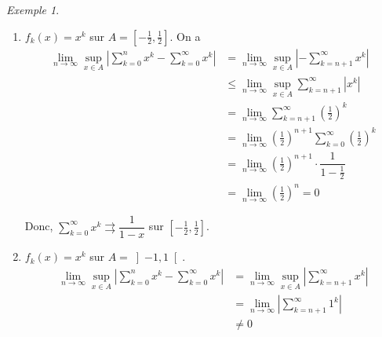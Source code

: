 \documentclass{report}
\newcommand*{\dsum}[4]{\displaystyle\sum_{#1=#2}^{#3}#4}
\newcommand*{\dlim}[3]{\displaystyle\lim_{#1 \to #2}#3}
\newcommand*{\abs}[1]{\left| #1 \right|}
\newcommand*{\convuni}{\rightrightarrows}
\newcommand*{\lte}{\leqslant}
\theoremstyle{definition}
\theoremstyle{remark}
\newtheorem*{exem}{Exemple}
\begin{document}
	\begin{exem}~

		\begin{enumerate}[label=\alph*)]
			\item $f_k(x)=x^k$ sur $A=\left[ -\frac{1}{2}, \frac{1}{2} \right]$. On a
			\begin{align*}
				\dlim{n}{\infty}{\sup\limits_{x \in A}\abs{\dsum{k}{0}{n}{x^k} - \dsum{k}{0}{\infty}{x^k}}}&= \dlim{n}{\infty}{\sup\limits_{x \in A}\abs{-\dsum{k}{n+1}{\infty}{x^k}}}\\
				&\lte \dlim{n}{\infty}{\sup\limits_{x \in A}\dsum{k}{n+1}{\infty}{\abs{x^k}}}\\
				&= \dlim{n}{\infty}{\dsum{k}{n+1}{\infty}{\left(\frac{1}{2}\right)^k}}\\
				&= \dlim{n}{\infty}{\left(\frac{1}{2}\right)^{n+1}\dsum{k}{0}{\infty}{\left(\frac{1}{2}\right)^k}}\\
				&= \dlim{n}{\infty}{\left(\frac{1}{2}\right)^{n+1} \cdot \dfrac{1}{1-\frac{1}{2}}}\\
				&= \dlim{n}{\infty}{\left(\frac{1}{2}\right)^n} = 0
			\end{align*}

			Donc, $\dsum{k}{0}{\infty}{x^k} \convuni \dfrac{1}{1-x}$ sur $\left[-\frac{1}{2}, \frac{1}{2}\right]$.
			\item $f_k(x) = x^k$ sur $A=\left]-1,1\right[$.
			\begin{align*}
				\dlim{n}{\infty}{\sup\limits_{x \in A}\abs{\dsum{k}{0}{n}{x^k} - \dsum{k}{0}{\infty}{x^k}}}&= \dlim{n}{\infty}{\sup\limits_{x \in A}\abs{\dsum{k}{n+1}{\infty}{x^k}}}\\
				&= \dlim{n}{\infty}{\abs{\dsum{k}{n+1}{\infty}{1^k}}}\\
				&\neq 0
			\end{align*}
		\end{enumerate}
	\end{exem}
\end{document}
